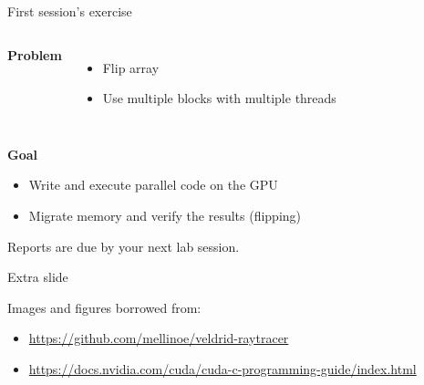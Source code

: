 \documentclass[11pt,t]{beamer}
\begin{document}
\begin{frame}{First session's exercise} 

    \vspace{0.25cm}

    \begin{columns}[t] %
    \textbf{Problem}
    \begin{itemize}\setlength\itemsep{0.5em}
        \item Flip array
        \item Use multiple blocks with multiple threads
    \end{itemize}
    

    \begin{figure}[t]
        \centering
        \begin{center}               
            \resizebox{0.98\columnwidth}{!}{}
        \end{center}
    \end{figure}
    
    \end{columns}


    \vspace{0.5cm}
    
    \textbf{Goal}
    \begin{itemize}\setlength\itemsep{0.5em}
        \item Write and execute parallel code on the GPU
        \item Migrate memory and verify the results (flipping)
    \end{itemize}

    \vspace{0.5cm}
    
    Reports are due by your next lab session.
    

\end{frame}




\appendix
\begin{frame}[noframenumbering,label=extraframe]{Extra slide}


\begin{footnotesize}

Images and figures borrowed from:

\begin{itemize}
    \item \url{https://github.com/mellinoe/veldrid-raytracer}
    \item \url{https://docs.nvidia.com/cuda/cuda-c-programming-guide/index.html}
\end{itemize}

\end{footnotesize}


\end{frame}
\end{document}
